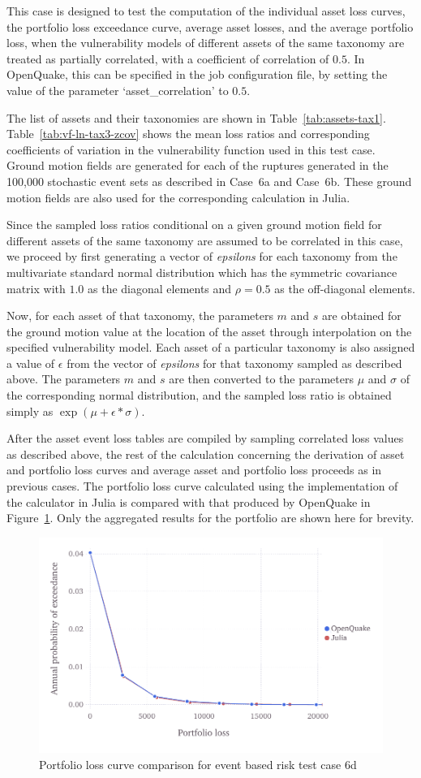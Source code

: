 This case is designed to test the computation of the individual asset loss curves, the portfolio loss exceedance curve, average asset losses, and the average portfolio loss, when the vulnerability models of different assets of the same taxonomy are treated as partially correlated, with a coefficient of correlation of $0.5$. In OpenQuake, this can be specified in the job configuration file, by setting the value of the parameter `asset\_correlation' to $0.5$.

The list of assets and their taxonomies are shown in Table~\ref{tab:assets-tax1}. Table~\ref{tab:vf-ln-tax3-zcov} shows the mean loss ratios and corresponding coefficients of variation in the vulnerability function used in this test case. Ground motion fields are generated for each of the ruptures generated in the 100,000 stochastic event sets as described in Case~6a and Case~6b. These ground motion fields are also used for the corresponding calculation in Julia.

Since the sampled loss ratios conditional on a given ground motion field for different assets of the same taxonomy are assumed to be  correlated in this case, we proceed by first generating a vector of \emph{epsilons} for each taxonomy from the multivariate standard normal distribution which has the symmetric covariance matrix with $1.0$ as the diagonal elements and $\rho = 0.5$ as the off-diagonal elements.

Now, for each asset of that taxonomy, the parameters $m$ and $s$ are obtained for the ground motion value at the location of the asset through interpolation on the specified vulnerability model. Each asset of a particular taxonomy is also assigned a value of $\epsilon$ from the vector of \emph{epsilons} for that taxonomy sampled as described above. The parameters $m$ and $s$ are then converted to the parameters $\mu$ and $\sigma$ of the corresponding normal distribution, and the sampled loss ratio is obtained simply as $\exp (\mu + \epsilon * \sigma)$.

After the asset event loss tables are compiled by sampling correlated loss values as described above, the rest of the calculation concerning the derivation of asset and portfolio loss curves and average asset and portfolio loss proceeds as in previous cases. The portfolio loss curve calculated using the implementation of the calculator in Julia is compared with that produced by OpenQuake in Figure~\ref{fig:lc-ebr-6d}. Only the aggregated results for the portfolio are shown here for brevity.

\begin{figure}[htbp]
\centering
\includegraphics[width=12cm]{qareport/figures/fig-lc-ebr-6d}
\caption{Portfolio loss curve comparison for event based risk test case 6d}
\label{fig:lc-ebr-6d}
\end{figure}